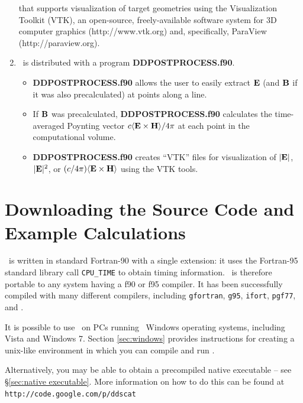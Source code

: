 \begin{enumerate}
    that supports visualization of target geometries using the
    Visualization Toolkit (VTK), an open-source, 
    freely-available software system
    for 3D computer graphics (http://www.vtk.org) and, specifically,
    ParaView (http://paraview.org).
\item \ddscatseventhree\ is distributed with a program {\bf DDPOSTPROCESS.f90}.
    \begin{itemize}
    \item {\bf DDPOSTPROCESS.f90} 
          allows the user to easily extract ${\bf E}$ (and ${\bf B}$ if it was
          also precalculated) at points along a line.
    \item If ${\bf B}$ was precalculated, {\bf DDPOSTPROCESS.f90} calculates
      the time-averaged Poynting vector $c\langle{\bf E}\times{\bf H}\rangle/4\pi$
      at each point in the computational volume.
    \item {\bf DDPOSTPROCESS.f90} 
          creates ``VTK'' files for visualization of $|{\bf E}|$,
          $|{\bf E}|^2$, or $(c/4\pi)\langle{\bf E}\times{\bf H}\rangle$ 
          using the VTK tools.
    \end{itemize}
    
\end{enumerate}

\section{Downloading the Source Code and Example Calculations
         \label{sec:downloading}}

\ddscatv\ is written in standard Fortran-90 with a single extension: it uses
the Fortran-95 standard library call {\tt CPU\_TIME} to obtain timing
information.
\ddscatv\ is therefore portable to
any system having a f90 or f95 compiler.
It has been successfully
compiled with many different compilers, including {\tt gfortran},
{\tt g95}, {\tt ifort}, {\tt pgf77}, and .

It is possible to use \ddscatv\ on PCs running \Microsoft\ Windows
operating systems, including Vista and Windows 7.
Section \ref{sec:windows} provides instructions for creating a unix-like
environment in which you can compile and run \ddscatv.

Alternatively, you may be able to obtain a precompiled native executable
-- see \S\ref{sec:native executable}.
More information on how to do this can be found at\\
{\tt http://code.google.com/p/ddscat}


